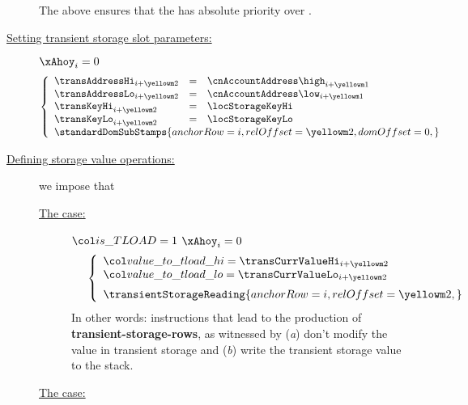 \begin{description}
		\saNote{}
		The above ensures that the \staticxSH{} has absolute priority over \oogxSH{}.
	\item[\underline{Setting transient storage slot parameters:}]
		\If $\xAhoy_{i} = 0$ \Then
		\[
			\left\{ \begin{array}{lclr}
				\transAddressHi         _{i + \locTransientDoingRow} & = & \cnAccountAddress\high  _{i + \locTransientCurrContextRow } \\
				\transAddressLo         _{i + \locTransientDoingRow} & = & \cnAccountAddress\low   _{i + \locTransientCurrContextRow } \\
				\transKeyHi             _{i + \locTransientDoingRow} & = & \locStorageKeyHi                                            \\
				\transKeyLo             _{i + \locTransientDoingRow} & = & \locStorageKeyLo                                            \\
				\multicolumn{3}{l}{
					\standardDomSubStamps {
						anchorRow = i                     ,
						relOffset = \locTransientDoingRow ,
						domOffset = 0                     ,
					}}
					\\
			\end{array} \right.
		\]
	\item[\underline{Defining storage value operations:}]
		we impose that
		\begin{description}
			\item[\underline{The  case:}]
				\If $\locIsTload = 1$ \et $\xAhoy_{i} = 0$ \Then
				\[
					\left\{ \begin{array}{lcl}
						\multicolumn{3}{l}{ \locTransientValueToLoadHi = \transCurrValueHi_{i + \locTransientDoingRow} }              \\
						\multicolumn{3}{l}{ \locTransientValueToLoadLo = \transCurrValueLo_{i + \locTransientDoingRow} } \vspace{2mm} \\
						\transientStorageReading {
							anchorRow = i                     ,
							relOffset = \locTransientDoingRow ,
						}
						\\
					\end{array} \right.
				\]
				\saNote{}
				In other words:  instructions that lead to the production of \textbf{transient-storage-rows}, as witnessed by
				(\emph{a}) don't modify the value in transient storage and
				(\emph{b}) write the transient storage value to the stack.
			\item[\underline{The  case:}]

\end{description}
\end{description}
